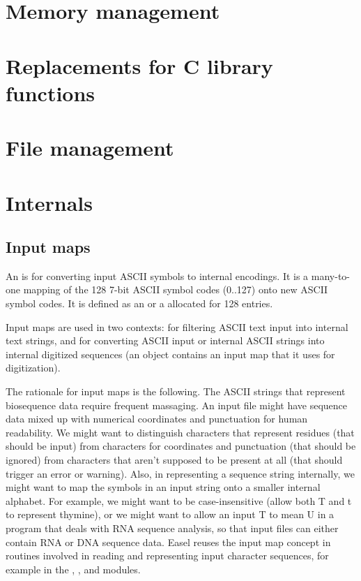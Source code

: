 \section{Memory management}


\section{Replacements for C library functions}


\section{File management}


\section{Internals}

\subsection{Input maps}

An  is for converting input ASCII symbols to
internal encodings. It is a many-to-one mapping of the 128 7-bit ASCII
symbol codes (0..127) onto new ASCII symbol codes. It is defined as
an  or a 
allocated for 128 entries.

Input maps are used in two contexts: for filtering ASCII text input
into internal text strings, and for converting ASCII input or internal
ASCII strings into internal digitized sequences (an 
object contains an input map that it uses for digitization).

The rationale for input maps is the following. The ASCII strings that
represent biosequence data require frequent massaging. An input file
might have sequence data mixed up with numerical coordinates and
punctuation for human readability. We might want to distinguish
characters that represent residues (that should be input) from
characters for coordinates and punctuation (that should be ignored)
from characters that aren't supposed to be present at all (that should
trigger an error or warning). Also, in representing a sequence string
internally, we might want to map the symbols in an input string onto a
smaller internal alphabet. For example, we might want to be
case-insensitive (allow both T and t to represent thymine), or we
might want to allow an input T to mean U in a program that deals with
RNA sequence analysis, so that input files can either contain RNA or
DNA sequence data.  Easel reuses the input map concept in routines
involved in reading and representing input character sequences, for
example in the , , and 
modules.

